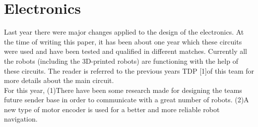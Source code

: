 \section{Electronics}
\setlength\intextsep{0pt}
Last year there were major changes applied to the design of the electronics. At the time of writing this paper, it has been about one year which these circuits were used and have been tested and qualified in different matches. Currently all the robots (including the 3D-printed robots) are functioning with the help of these circuits. The reader is referred to the previous years TDP [1]of this team for more details about the main circuit.\\
\indent For this year, (1)There have been some research made for designing the teams future sender base in order to communicate with a great number of robots. (2)A new type of motor encoder is used for a better and more reliable robot navigation.

